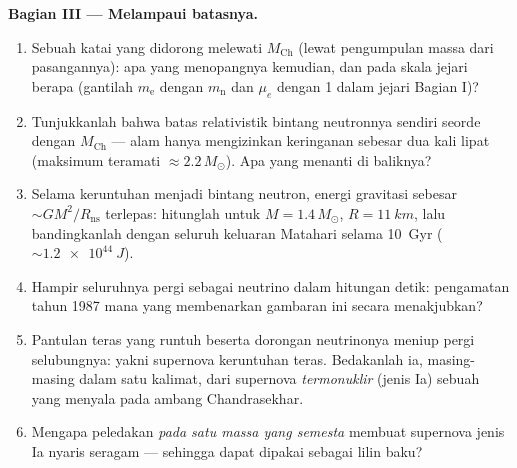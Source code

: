 \begin{problem}
\medskip\noindent\textbf{Bagian III --- Melampaui batasnya.}
\begin{enumerate}[resume]
  \item Sebuah katai yang didorong melewati $M_{\text{Ch}}$ (lewat
        pengumpulan massa dari pasangannya): apa yang menopangnya
        kemudian, dan pada skala jejari berapa (gantilah $m_{\text{e}}$
        dengan $m_{\text{n}}$ dan $\mu_e$ dengan 1 dalam jejari Bagian I)?
  \item Tunjukkanlah bahwa batas relativistik bintang neutronnya sendiri
        seorde dengan $M_{\text{Ch}}$ --- alam hanya mengizinkan
        keringanan sebesar dua kali lipat (maksimum teramati $\approx
        2.2\,M_\odot$). Apa yang menanti di baliknya?
  \item Selama keruntuhan menjadi bintang neutron, energi gravitasi
        sebesar $\sim GM^2/R_{
        \text{ns}}$ terlepas: hitunglah
        untuk $M = 1.4\,M_\odot$, $R = \qty{11}{km}$, lalu
        bandingkanlah dengan seluruh keluaran Matahari selama \qty{10}{Gyr}
        ($\sim\qty{1.2e44}{J}$).
  \item Hampir seluruhnya pergi sebagai neutrino dalam hitungan detik:
        pengamatan tahun 1987 mana yang membenarkan gambaran ini secara
        menakjubkan?
  \item Pantulan teras yang runtuh beserta dorongan neutrinonya meniup
        pergi selubungnya: yakni supernova keruntuhan teras. Bedakanlah
        ia, masing-masing dalam satu kalimat, dari supernova
        \emph{termonuklir} (jenis Ia) sebuah  yang menyala
        pada ambang Chandrasekhar.
  \item Mengapa peledakan \emph{pada satu massa yang semesta} membuat
        supernova jenis Ia nyaris seragam --- sehingga dapat dipakai
        sebagai lilin baku?
\end{enumerate}


\end{problem}
